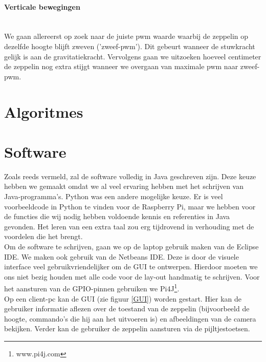 \documentclass[tt]{penoverslag}
\begin{document}
\paragraph{Verticale bewegingen} ~\\ 
We gaan allereerst op zoek naar de juiste pwm waarde waarbij de zeppelin op dezelfde hoogte blijft zweven ('zweef-pwm').  Dit gebeurt wanneer de stuwkracht gelijk is aan de gravitatiekracht.  Vervolgens gaan we uitzoeken hoeveel centimeter de zeppelin nog extra stijgt wanneer we overgaan van maximale pwm naar zweef-pwm.\\



\section{Algoritmes}



\section{Software}
Zoals reeds vermeld, zal de software volledig in Java geschreven zijn. Deze keuze hebben we gemaakt omdat we al veel ervaring hebben met het schrijven van Java-programma's. Python was een andere mogelijke keuze. Er is veel voorbeeldcode in Python te vinden voor de Raspberry Pi, maar we hebben voor de functies die wij nodig hebben voldoende kennis en referenties in Java gevonden. Het leren van een extra taal zou erg tijdrovend in verhouding met de voordelen die het brengt. \\

Om de software te schrijven, gaan we op de laptop gebruik maken van de Eclipse IDE. We maken ook gebruik van de Netbeans IDE. Deze is door de visuele interface veel gebruikvriendelijker om de GUI te ontwerpen. Hierdoor moeten we ons niet bezig houden met alle code voor de lay-out handmatig te schrijven. Voor het aansturen van de GPIO-pinnen gebruiken we Pi4J\footnote{www.pi4j.com}.\\

Op een client-pc kan de GUI (zie figuur \ref{GUI}) worden gestart. Hier kan de gebruiker informatie aflezen over de toestand van de zeppelin (bijvoorbeeld de hoogte, commando's die hij aan het uitvoeren is) en afbeeldingen van de camera bekijken. Verder kan de gebruiker de zeppelin aansturen via de pijltjestoetsen. \\
\end{document}
